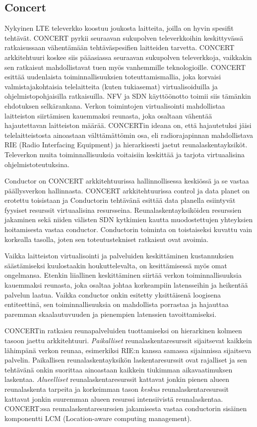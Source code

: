 \documentclass[finnish]{tktltiki2}
\theoremstyle{definition}
\theoremstyle{remark}
\begin{document}
\subsection{Concert}
Nykyinen LTE televerkko koostuu joukosta laitteita, joilla on hyvin spesifit tehtävät. CONCERT pyrkii seuraavan sukupolven televerkkoihin keskittyvässä ratkaisussaan vähentämään tehtäväspesifien laitteiden tarvetta. 
CONCERT arkkitehtuuri koskee siis pääasiassa seuraavan sukupolven televerkkoja, vaikkakin sen ratkaisut mahdollistavat tuen myös vanhemmille teknologioille. CONCERT esittää uudenlaista toiminnallisuuksien toteuttamismallia, joka korvaisi valmistajakohtaisia telelaitteita (kuten tukiasemat) virtualisoiduilla ja ohjelmistopohjaisilla ratkaisuilla. NFV ja SDN käyttöönotto toimii siis tämänkin ehdotuksen selkärankana.
Verkon toimintojen virtualisointi mahdollistaa laitteiston siirtämisen kauemmaksi reunasta, joka osaltaan vähentää hajautettavan laitteiston määrää. CONCERTin ideana on, että hajautetuksi jäisi telelaitteistosta ainoastaan välttämättömin osa, eli radiorajapinnan mahdollistava RIE (Radio Interfacing Equipment) ja hierarkisesti jaetut reunalaskentayksiköt. Televerkon muita toiminnallisuuksia voitaisiin keskittää ja tarjota virtuaalisina ohjelmistoteutuksina. 

Conductor on CONCERT arkkitehtuurissa hallinnollisessa keskiössä ja se vastaa päällysverkon hallinnasta.
CONCERT arkkitehtuurissa control ja data planet on erotettu toisistaan ja Conductorin tehtävänä esittää data planella esiintyvät fyysiset resurssit virtuaalisina resursseina.
Reunalaskentayksiköiden resurssien jakaminen sekä niiden välisten SDN kytkimien kautta muodostettujen yhteyksien hoitamisesta vastaa conductor.
Conductorin toiminta on toistaiseksi kuvattu vain korkealla tasolla, joten sen toteutustekniset ratkaisut ovat avoimia.

Vaikka laitteiston virtualisointi ja palveluiden keskittäminen kustannuksien säästämiseksi kuulostaakin houkuttelevalta, on kesittämisessä myös omat ongelmansa.
Etenkin liiallinen keskittäminen siirtää verkon toiminnallisuuksia kauemmaksi reunasta, joka osaltaa johtaa korkeampiin latensseihin ja heikentää palvelun laatua. Vaikka conductor onkin esitetty yksittäisenä loogisena entiteettinä, sen toiminnallisuuksia on mahdollista porrastaa ja hajauttaa paremman skaalautuvuuden ja pienempien latenssien tavoittamiseksi.

CONCERTin ratkaisu reunapalveluiden tuottamiseksi on hierarkinen kolmeen tasoon jaettu arkkitehtuuri.
\textit{Paikalliset} reunalaskentaresurssit sijaitsevat kaikkein lähimpänä verkon reunaa, esimerkiksi RIE:n kanssa samassa sijainnissa sijaitseva palvelin. Paikallisen reunalaskentayksikön laskentaresurssit ovat rajalliset ja sen tehtävänä onkin suorittaa ainoastaan kaikkein tiukimman aikavaatimuksen laskentaa.
\textit{Alueelliset} reunalaskentaresurssit kattavat jonkin pienen alueen reunalaskenta tarpeita ja korkeimman tason \textit{keskus} reunalaskentaresurssit kattavat jonkin suuremman alueen resurssi intensiivistä reunalaskentaa.
CONCERT:ssa reunalaskentaresurssien jakamisesta vastaa conductorin sisäinen komponentti LCM (Location-aware computing management).
\end{document}

